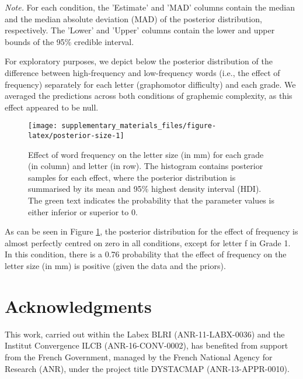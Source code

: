 \documentclass[
  11pt,
  english,
  ,doc,mask,floatsintext]{apa6}
\begin{document}
\begin{table}[htb]
\begin{center}
\begin{threeparttable}
{}

\begin{tablenotes}[para]
\normalsize{\textit{Note.} For each condition, the 'Estimate' and 'MAD' columns contain the
    median and the median absolute deviation (MAD) of the posterior distribution,
    respectively. The 'Lower' and 'Upper' columns contain the lower and upper
    bounds of the 95\% credible interval.}
\end{tablenotes}

\end{threeparttable}
\end{center}

\end{table}

For exploratory purposes, we depict below the posterior distribution of the difference between high-frequency and low-frequency words (i.e., the effect of frequency) separately for each letter (graphomotor difficulty) and each grade. We averaged the predictions across both conditions of graphemic complexity, as this effect appeared to be null.

\begin{figure}[!htb]

{\centering \texttt{[image: supplementary\_materials\_files/figure-latex/posterior-size-1]} 

}

\caption{Effect of word frequency on the letter size (in mm) for each grade (in column) and letter (in row). The histogram contains posterior samples for each effect, where the posterior distribution is summarised by its mean and 95\% highest density interval (HDI). The green text indicates the probability that the parameter values is either inferior or superior to 0.}\label{fig:posterior-size}
\end{figure}

As can be seen in Figure \ref{fig:posterior-size}, the posterior distribution for the effect of frequency is almost perfectly centred on zero in all conditions, except for letter f in Grade 1. In this condition, there is a 0.76 probability that the effect of frequency on the letter size (in mm) is positive (given the data and the priors).

\hypertarget{acknowledgments}{%
\section{Acknowledgments}\label{acknowledgments}}

This work, carried out within the Labex BLRI (ANR-11-LABX-0036) and the Institut Convergence ILCB (ANR-16-CONV-0002), has benefited from support from the French Government, managed by the French National Agency for Research (ANR), under the project title DYSTACMAP (ANR-13-APPR-0010).
\end{document}

